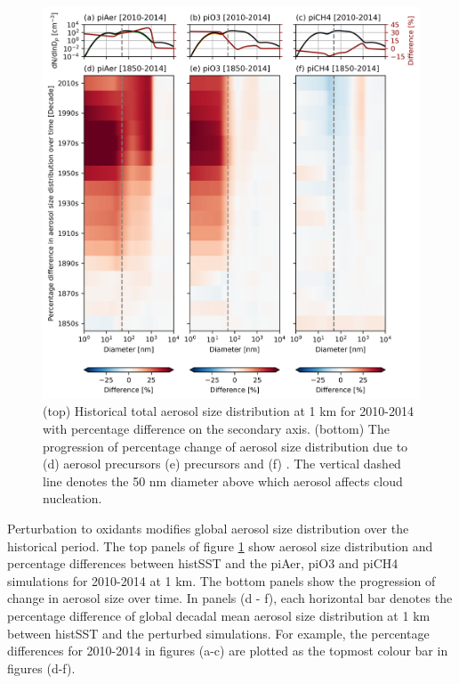 \begin{figure}
    \centering
    \includegraphics[width=\linewidth]{Chapter3/Figs/f08_aerosol-size-dist-over-time.png}
    \caption{(top) Historical total aerosol size distribution at 1 km for 2010-2014 with percentage difference on the secondary axis. (bottom) The progression of percentage change of aerosol size distribution due to (d) aerosol precursors (e)  precursors and (f) . The vertical dashed line denotes the 50 nm diameter above which aerosol affects cloud nucleation.}
    \label{fig:aerosol-size-dist-time}
\end{figure}


Perturbation to oxidants modifies global aerosol size distribution over the historical period. The top panels of figure \ref{fig:aerosol-size-dist-time} show aerosol size distribution and percentage differences between histSST and the piAer, piO3 and piCH4 simulations for 2010-2014 at 1 km. The bottom panels show the progression of change in aerosol size over time. In panels (d - f), each horizontal bar denotes the percentage difference of global decadal mean aerosol size distribution at 1 km between histSST and the perturbed simulations. For example, the percentage differences for 2010-2014 in figures (a-c) are plotted as the topmost colour bar in figures (d-f). 


